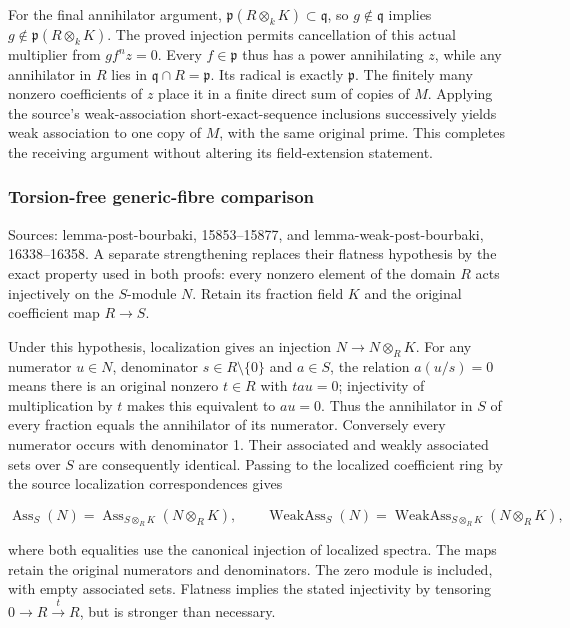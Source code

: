 For the final annihilator argument, \(\mathfrak p(R\otimes_kK)\subset\mathfrak q\), so \(g\notin\mathfrak q\) implies \(g\notin\mathfrak p(R\otimes_kK)\). The proved injection permits cancellation of this actual multiplier from \(gf^nz=0\). Every \(f\in\mathfrak p\) thus has a power annihilating \(z\), while any annihilator in \(R\) lies in \(\mathfrak q\cap R=\mathfrak p\). Its radical is exactly \(\mathfrak p\). The finitely many nonzero coefficients of \(z\) place it in a finite direct sum of copies of \(M\). Applying the source's weak-association short-exact-sequence inclusions successively yields weak association to one copy of \(M\), with the same original prime. This completes the receiving argument without altering its field-extension statement.

\subsubsection{Torsion-free generic-fibre comparison}\label{algebra-proof-005-torsion-free-generic-fibre-comparison}

Sources: lemma-post-bourbaki, 15853--15877, and lemma-weak-post-bourbaki, 16338--16358. A separate strengthening replaces their flatness hypothesis by the exact property used in both proofs: every nonzero element of the domain \(R\) acts injectively on the \(S\)-module \(N\). Retain its fraction field \(K\) and the original coefficient map \(R\to S\).

Under this hypothesis, localization gives an injection \(N\to N\otimes_RK\). For any numerator \(u\in N\), denominator \(s\in R\setminus\{0\}\) and \(a\in S\), the relation \(a(u/s)=0\) means there is an original nonzero \(t\in R\) with \(tau=0\); injectivity of multiplication by \(t\) makes this equivalent to \(au=0\). Thus the annihilator in \(S\) of every fraction equals the annihilator of its numerator. Conversely every numerator occurs with denominator 1. Their associated and weakly associated sets over \(S\) are consequently identical. Passing to the localized coefficient ring by the source localization correspondences gives

\[
\operatorname{Ass}_S(N)=\operatorname{Ass}_{S\otimes_RK}(N\otimes_RK),\qquad
\operatorname{WeakAss}_S(N)=\operatorname{WeakAss}_{S\otimes_RK}(N\otimes_RK),
\]

where both equalities use the canonical injection of localized spectra. The maps retain the original numerators and denominators. The zero module is included, with empty associated sets. Flatness implies the stated injectivity by tensoring \(0\to R\xrightarrow{t}R\), but is stronger than necessary.

